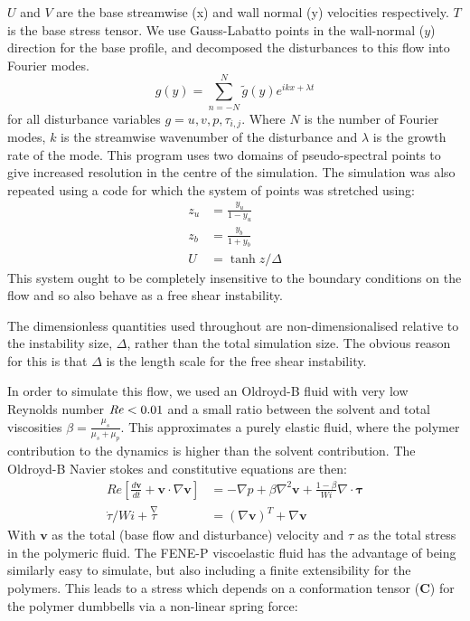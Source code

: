 \documentclass{jfm}
\newcommand{\dt}[1]{\frac{d #1}{d t}} %
\newcommand\Rey{\mbox{\textit{Re}}}  %
\begin{document}
$U$ and $V$ are the base streamwise (x) and wall normal (y) velocities
respectively. $T$ is the base stress tensor. We use Gauss-Labatto points in the
wall-normal ($y$) direction for the base profile, and decomposed the
disturbances to this flow into Fourier modes.  
\begin{equation}
    g(y) = \sum\limits_{n=-N}^{N} \widetilde{g}(y) e^{ikx + \lambda t}
\end{equation}
for all disturbance variables $g = u, v, p, \tau_{i,j}$. Where $N$ is the
number of Fourier modes, $k$ is the streamwise wavenumber of the disturbance
and $\lambda$ is the growth rate of the mode. This program uses two domains of
pseudo-spectral points to give increased resolution in the centre of the
simulation. The simulation was also repeated using a code for which the system
of points was stretched using: 
\begin{align}
    z_{u} &= \frac{y_{u}}{1-y_{u}} \\
    z_{b} &= \frac{y_{b}}{1+y_{b}} \\
    U     &= \tanh{z/\Delta} 
    \label{eq:KH_inf_profile}
\end{align}
This system ought to be completely insensitive to the boundary conditions on
the flow and so also behave as a free shear instability. 

The dimensionless quantities used throughout are non-dimensionalised relative
to the instability size, $\Delta$, rather than the total simulation size. The
obvious reason for this is that $\Delta$ is the length scale for the free shear
instability.

In order to simulate this flow, we used an Oldroyd-B fluid with very low
Reynolds number $\Rey < 0.01$ and a small ratio between the solvent and total
viscosities $\beta = \frac{\mu_{s}}{\mu_{s}+\mu_{p}}$. This approximates a
purely elastic fluid, where the polymer contribution to the dynamics is higher
than the solvent contribution. The Oldroyd-B Navier stokes and constitutive
equations are then: 
\begin{align}
    Re \left[ \dt{\mathbf{v}} + \mathbf{v} \cdot \nabla  \mathbf{v} \right] &=
    - \nabla p + \beta \nabla^{2} \mathbf{v} + \frac{1-\beta}{Wi} \nabla \cdot
    \mathbf{\tau} \\ \dot{\tau}/Wi + \overset{\nabla}\tau &= \left(\nabla
    \mathbf{v}\right)^{T} + \nabla{\mathbf{v}}
\end{align}
With $\mathbf{v}$ as the total (base flow and disturbance) velocity and $\tau$
as the total stress in the polymeric fluid. The FENE-P viscoelastic fluid has
the advantage of being similarly easy to simulate, but also including a finite
extensibility for the polymers. This leads to a stress which depends on a
conformation tensor ($\mathbf{C}$) for the polymer dumbbells via a non-linear
spring force:
\end{document}
